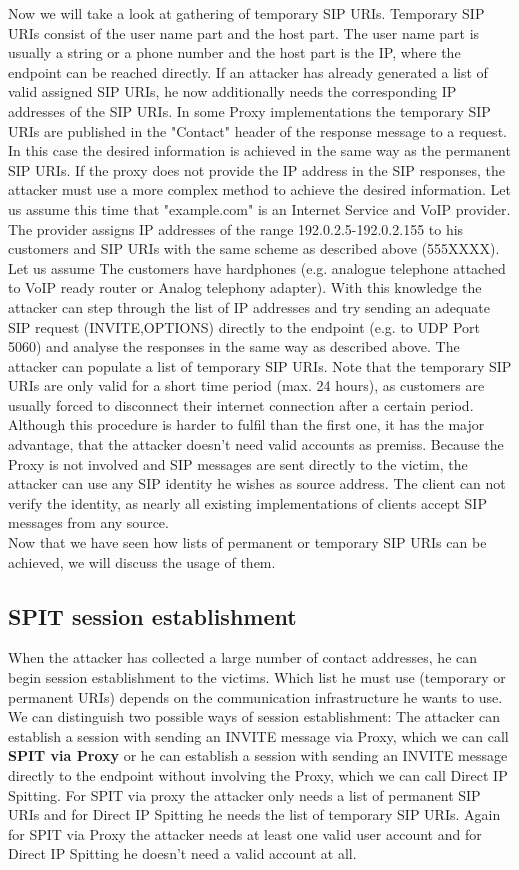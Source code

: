 \documentclass[final
	]{issa}
\begin{document}
Now we will take a look at gathering of temporary SIP URIs. Temporary SIP URIs consist of the user name part and the host part. The user name part is usually a string or a phone number and the host part is the IP, where the endpoint can be reached directly. If an attacker has already generated a list of valid assigned SIP URIs, he now additionally needs the corresponding IP addresses of the SIP URIs. In some Proxy implementations the temporary SIP URIs are published in the "Contact" header of the response message to a request. In this case the desired information is achieved in the same way as the permanent SIP URIs. If the proxy does not provide the IP address in the SIP responses, the attacker must use a more complex method to achieve the desired information.
Let us assume this time that "example.com" is an Internet Service and VoIP provider. The provider assigns IP addresses of the range 192.0.2.5-192.0.2.155 to his customers and SIP URIs with the same scheme as described above (555XXXX). Let us assume The customers have hardphones (e.g. analogue telephone attached to VoIP ready router or Analog telephony adapter). With this knowledge the attacker can step through the list of IP addresses and try sending an adequate SIP request (INVITE,OPTIONS) directly to the endpoint (e.g. to UDP Port 5060) and analyse the responses in the same way as described above. The attacker can populate a list of temporary SIP URIs. Note that the temporary SIP URIs are only valid for a short time period (max. 24 hours), as customers are usually forced to disconnect their internet connection after a certain period. Although this procedure is harder to fulfil than the first one, it has the major advantage, that the attacker doesn't need valid accounts as premiss. Because the Proxy is not involved and SIP messages are sent directly to the victim, the attacker can use any SIP identity he wishes as source address. The client can not verify the identity, as nearly all existing implementations of clients accept SIP messages from any source.\\
Now that we have seen how lists of permanent or temporary SIP URIs can be achieved, we will discuss the usage of them.
\subsection{SPIT session establishment}
When the attacker has collected a large number of contact addresses, he can begin session establishment to the victims. Which list he must use (temporary or permanent URIs) depends on the communication infrastructure he wants to use. We can distinguish two possible ways of session establishment: The attacker can establish a session with sending an INVITE message via Proxy, which we can call \textbf{SPIT via Proxy} or he can establish a session with sending an INVITE message directly to the endpoint without involving the Proxy, which we can call {Direct IP Spitting}. For SPIT via proxy the attacker only needs a list of permanent SIP URIs and for Direct IP Spitting he needs the list of temporary SIP URIs. Again for SPIT via Proxy the attacker needs at least one valid user account and for Direct IP Spitting he doesn't need a valid account at all.
\end{document}
